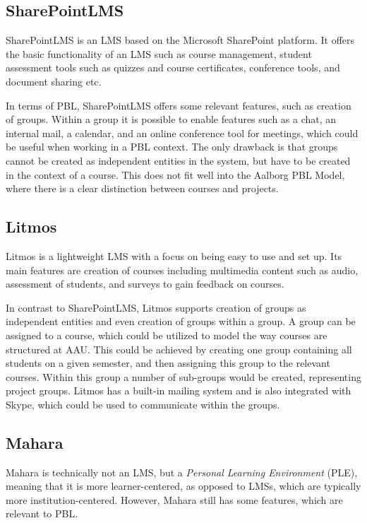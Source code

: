 \subsection{SharePointLMS}
SharePointLMS \citep{sharepointlms} is an LMS based on the Microsoft SharePoint platform. 
It offers the basic functionality of an LMS such as course management, student assessment tools such as quizzes and course certificates, conference tools, and document sharing etc.

In terms of PBL, SharePointLMS offers some relevant features, such as creation of groups.
Within a group it is possible to enable features such as a chat, an internal mail, a calendar, and an online conference tool for meetings, which could be useful when working in a PBL context.
The only drawback is that groups cannot be created as independent entities in the system, but have to be created in the context of a course.
This does not fit well into the Aalborg PBL Model, where there is a clear distinction between courses and projects.

\subsection{Litmos}
Litmos \citep{litmos} is a lightweight LMS with a focus on being easy to use and set up.
Its main features are creation of courses including multimedia content such as audio, assessment of students, and surveys to gain feedback on courses.

In contrast to SharePointLMS, Litmos supports creation of groups as independent entities and even creation of groups within a group.
A group can be assigned to a course, which could be utilized to model the way courses are structured at AAU.
This could be achieved by creating one group containing all students on a given semester, and then assigning this group to the relevant courses.
Within this group a number of sub-groups would be created, representing project groups.
Litmos has a built-in mailing system and is also integrated with Skype, which could be used to communicate within the groups.


\subsection{Mahara}
Mahara \citep{mahara} is technically not an LMS, but a \emph{Personal Learning Environment} (PLE), meaning that it is more learner-centered, as opposed to LMSs, which are typically more institution-centered.
However, Mahara still has some features, which are relevant to PBL.

